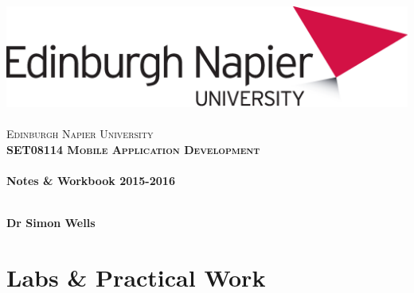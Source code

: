 \documentclass[12pt, a4paper, twoside]{book}
\begin{document}
\frontmatter

\begin{titlepage}
\vspace*{5cm}
\begin{center}
\includegraphics[width=.5\textwidth]{images/EdNapUniLogoCMYK}~\\[1cm]

\textsc{\Large Edinburgh Napier University}\\[1.5cm]

\textsc{\LARGE \bfseries SET08114 Mobile Application Development}\\[0.5cm]

\hrulefill \\[0.4cm]
{\huge \bfseries Notes \& Workbook 2015-2016 \\[0.4cm] }
\hrulefill \\[1.5cm]

\begin{minipage}{0.4\textwidth}
\begin{flushleft} \large
\textbf{Dr Simon Wells} \\
\end{flushleft}
\end{minipage}

\vfill

\end{center}
\end{titlepage}


\setcounter{tocdepth}{2}
\cleardoublepage
\tableofcontents
\listoffigures
{}

\mainmatter



\part{Labs \& Practical Work}
\end{document}
